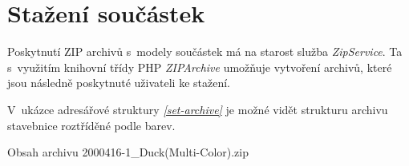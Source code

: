 \section{Stažení součástek}
Poskytnutí ZIP archivů s~modely součástek má na starost služba \textit{ZipService}. Ta s~využitím knihovní třídy PHP \textit{ZIPArchive} umožňuje vytvoření archivů, které jsou následně poskytnuté uživateli ke stažení. 

V~ukázce adresářové struktury \emph{\ref{set-archive}} je možné vidět strukturu archivu stavebnice roztříděné podle barev.

\begin{dirfigure}%
    \caption{Obsah archivu 2000416-1\_Duck(Multi-Color).zip}\label{set-archive}
\end{dirfigure}